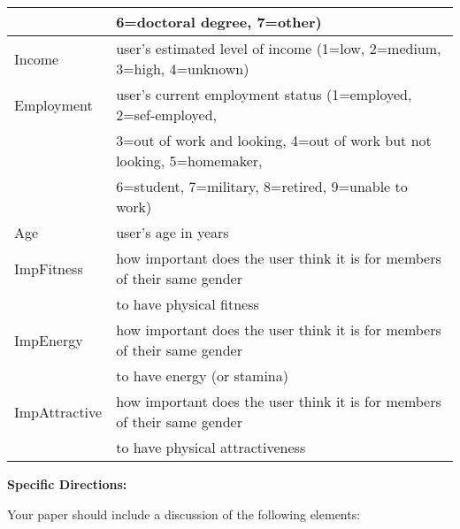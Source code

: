 \documentclass[12pt]{report}
\begin{document}
\begin{center}
\begin{tabular}{l l}
          &  6=doctoral degree, 7=other)\\ \hline
Income & user's estimated level of income (1=low, 2=medium, 3=high, 4=unknown)\\ \hline
Employment & user's current employment status (1=employed, 2=sef-employed,\\
           & 3=out of work and looking, 4=out of work but not looking, 5=homemaker,\\
           & 6=student, 7=military, 8=retired, 9=unable to work)\\ \hline
Age & user's age in years\\ \hline
ImpFitness & how important does the user think it is for members of their same gender\\
          & to have physical fitness\\ \hline
ImpEnergy & how important does the user think it is for members of their same gender\\
          & to have energy (or stamina)\\ \hline
ImpAttractive & how important does the user think it is for members of their same gender\\
          & to have physical attractiveness\\ \hline
\end{tabular}
\end{center}

\newpage

\large {\bf Specific Directions:}\\
\normalsize

Your paper should include a discussion of the following elements:\\
\end{document}
